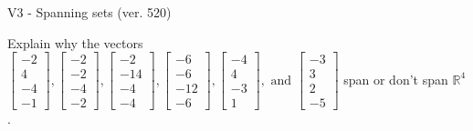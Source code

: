 \begin{exercise}
  \begin{exerciseTitle}V3 - Spanning sets (ver. 520)\end{exerciseTitle}
  \begin{exerciseStatement}
    Explain why the vectors \(\left[\begin{array}{r}
-2 \\
4 \\
-4 \\
-1
\end{array}\right] , \left[\begin{array}{r}
-2 \\
-2 \\
-4 \\
-2
\end{array}\right] , \left[\begin{array}{r}
-2 \\
-14 \\
-4 \\
-4
\end{array}\right] , \left[\begin{array}{r}
-6 \\
-6 \\
-12 \\
-6
\end{array}\right] , \left[\begin{array}{r}
-4 \\
4 \\
-3 \\
1
\end{array}\right] , \text{ and } \left[\begin{array}{r}
-3 \\
3 \\
2 \\
-5
\end{array}\right]\) span or don't span \(\mathbb{R}^4\). 
	



\end{exerciseStatement}
\end{exercise}
